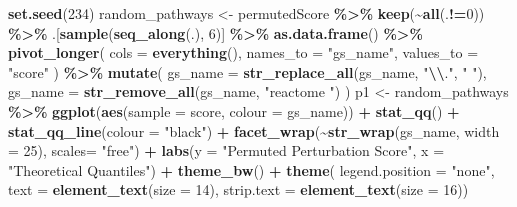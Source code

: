 \documentclass[9pt,a4paper,]{extarticle}
\newenvironment{Shaded}{\begin{snugshade}}{\end{snugshade}}
\newcommand{\AttributeTok}[1]{\textcolor[rgb]{0.13,0.29,0.53}{#1}}
\newcommand{\DecValTok}[1]{\textcolor[rgb]{0.00,0.00,0.81}{#1}}
\newcommand{\FunctionTok}[1]{\textcolor[rgb]{0.13,0.29,0.53}{\textbf{#1}}}
\newcommand{\NormalTok}[1]{#1}
\newcommand{\OtherTok}[1]{\textcolor[rgb]{0.56,0.35,0.01}{#1}}
\newcommand{\SpecialCharTok}[1]{\textcolor[rgb]{0.81,0.36,0.00}{\textbf{#1}}}
\newcommand{\StringTok}[1]{\textcolor[rgb]{0.31,0.60,0.02}{#1}}
\begin{document}
\begin{Shaded}
\begin{Highlighting}[]
\FunctionTok{set.seed}\NormalTok{(}\DecValTok{234}\NormalTok{)}
\NormalTok{random\_pathways }\OtherTok{\textless{}{-}}\NormalTok{ permutedScore }\SpecialCharTok{\%\textgreater{}\%}
    \FunctionTok{keep}\NormalTok{(}\SpecialCharTok{\textasciitilde{}}\FunctionTok{all}\NormalTok{(.}\SpecialCharTok{!=}\DecValTok{0}\NormalTok{)) }\SpecialCharTok{\%\textgreater{}\%}
\NormalTok{    .[}\FunctionTok{sample}\NormalTok{(}\FunctionTok{seq\_along}\NormalTok{(.), }\DecValTok{6}\NormalTok{)] }\SpecialCharTok{\%\textgreater{}\%}
    \FunctionTok{as.data.frame}\NormalTok{() }\SpecialCharTok{\%\textgreater{}\%}
    \FunctionTok{pivot\_longer}\NormalTok{(}
      \AttributeTok{cols =} \FunctionTok{everything}\NormalTok{(), }\AttributeTok{names\_to =} \StringTok{"gs\_name"}\NormalTok{, }\AttributeTok{values\_to =} \StringTok{"score"}
\NormalTok{    ) }\SpecialCharTok{\%\textgreater{}\%}
    \FunctionTok{mutate}\NormalTok{(}
        \AttributeTok{gs\_name =} \FunctionTok{str\_replace\_all}\NormalTok{(gs\_name, }\StringTok{"}\SpecialCharTok{\textbackslash{}\textbackslash{}}\StringTok{."}\NormalTok{, }\StringTok{" "}\NormalTok{),}
        \AttributeTok{gs\_name =} \FunctionTok{str\_remove\_all}\NormalTok{(gs\_name, }\StringTok{"reactome "}\NormalTok{)}
\NormalTok{    ) }
\NormalTok{p1 }\OtherTok{\textless{}{-}}\NormalTok{ random\_pathways }\SpecialCharTok{\%\textgreater{}\%}
  \FunctionTok{ggplot}\NormalTok{(}\FunctionTok{aes}\NormalTok{(}\AttributeTok{sample =}\NormalTok{ score, }\AttributeTok{colour =}\NormalTok{ gs\_name)) }\SpecialCharTok{+}
  \FunctionTok{stat\_qq}\NormalTok{() }\SpecialCharTok{+}
  \FunctionTok{stat\_qq\_line}\NormalTok{(}\AttributeTok{colour =} \StringTok{"black"}\NormalTok{) }\SpecialCharTok{+}
  \FunctionTok{facet\_wrap}\NormalTok{(}\SpecialCharTok{\textasciitilde{}}\FunctionTok{str\_wrap}\NormalTok{(gs\_name, }\AttributeTok{width =} \DecValTok{25}\NormalTok{), }\AttributeTok{scales=} \StringTok{"free"}\NormalTok{) }\SpecialCharTok{+} 
  \FunctionTok{labs}\NormalTok{(}\AttributeTok{y =} \StringTok{"Permuted Perturbation Score"}\NormalTok{, }\AttributeTok{x =} \StringTok{"Theoretical Quantiles"}\NormalTok{) }\SpecialCharTok{+}
  \FunctionTok{theme\_bw}\NormalTok{() }\SpecialCharTok{+}
  \FunctionTok{theme}\NormalTok{(}
      \AttributeTok{legend.position =} \StringTok{"none"}\NormalTok{, }
      \AttributeTok{text =} \FunctionTok{element\_text}\NormalTok{(}\AttributeTok{size =} \DecValTok{14}\NormalTok{), }
      \AttributeTok{strip.text =} \FunctionTok{element\_text}\NormalTok{(}\AttributeTok{size =} \DecValTok{16}\NormalTok{))}

\end{Highlighting}
\end{Shaded}
\end{document}
